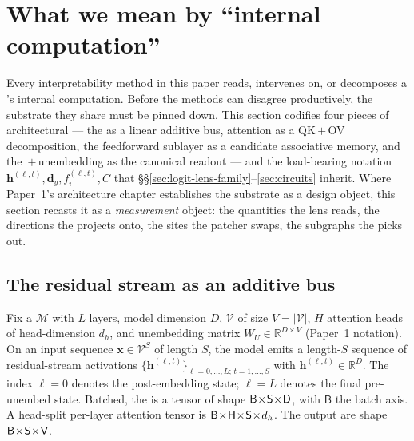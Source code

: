 
\section{What we mean by ``internal computation''}
\label{sec:substrate}

Every interpretability method in this paper reads, intervenes on, or
decomposes a 's internal computation. Before the methods can
disagree productively, the substrate they share must be pinned down.
This section codifies four pieces of architectural  --- the
 as a linear additive bus, attention as a
QK\,$+$\,OV decomposition, the feedforward sublayer as a candidate
associative memory, and the \,$+$\,unembedding as the canonical
readout --- and the load-bearing notation
$\mathbf{h}^{(\ell,t)}, \mathbf{d}_y, f_i^{(\ell,t)}, C$ that
\S\S\ref{sec:logit-lens-family}--\ref{sec:circuits} inherit. Where
Paper~1's architecture chapter establishes the substrate as a design
object, this section recasts it as a \emph{measurement} object: the
quantities the lens reads, the directions the  projects onto, the
sites the patcher swaps, the subgraphs the  picks out.

\subsection{The residual stream as an additive bus}
\label{sec:substrate-residual}

Fix a   $\mathcal{M}$ with $L$ layers, model
dimension $D$,  $\mathcal{V}$ of size $V = |\mathcal{V}|$,
$H$ attention heads of head-dimension $d_h$, and unembedding matrix
$W_U \in \mathbb{R}^{D \times V}$ (Paper~1 notation). On an input
sequence $\mathbf{x} \in \mathcal{V}^S$ of length $S$, the model emits
a length-$S$ sequence of residual-stream activations
$\{\mathbf{h}^{(\ell, t)}\}_{\ell=0,\dots,L;\, t=1,\dots,S}$ with
$\mathbf{h}^{(\ell, t)} \in \mathbb{R}^D$. The index $\ell = 0$ denotes
the post-embedding state; $\ell = L$ denotes the final pre-unembed
state. Batched, the  is a tensor of shape $\mathsf{B}\!\times\!\mathsf{S}\!\times\!\mathsf{D}$, with
$\mathsf{B}$ the batch axis. A head-split per-layer attention tensor is
$\mathsf{B}\!\times\!\mathsf{H}\!\times\!\mathsf{S}\!\times\!d_h$. The output  are shape $\mathsf{B}\!\times\!\mathsf{S}\!\times\!\mathsf{V}$.

